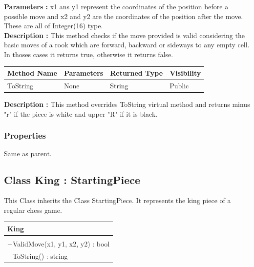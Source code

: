 \documentclass[12pt]{article}
\begin{document}
\textbf{Parameters :} x1 ans y1 represent the coordinates of the position before a possible move
and x2 and y2 are the coordinates of the position after the move. These are all of Integer(16) type.
\\
\textbf{Description :} This method checks if the move provided is
valid considering the basic moves of a rook which are forward,
backward or sideways to any empty cell. In thoses cases it returns
true, otherwise it returns false. 

\begin{table}[H]
    \begin{tabular}{|l|l|l|l|}
    \hline
    \rowcolor[HTML]{EFEFEF} 
    \cellcolor[HTML]{EFEFEF}\textbf{Method Name} & \textbf{Parameters}  & \textbf{Returned Type} & \textbf{Visibility} \\ \hline
    ToString                                   & None                 & String                   & Public              \\ \hline
    \end{tabular}
\end{table}

\textbf{Description :} This method overrides ToString virtual
method and returns minus "r" if the piece is white and upper "R"
if it is black.

\subsubsection{Properties}

Same as parent.
\newpage


\subsection{Class King : StartingPiece}

This Class inherits the Class StartingPiece. It represents the king 
piece of a regular chess game.
\begin{table}[H]
    \begin{tabular}{|l|}
    \hline
    \cellcolor[HTML]{C0C0C0}\textbf{King} \\ \hline
    \cellcolor[HTML]{EFEFEF}                    \\ \hline
    +ValidMove(x1, y1, x2, y2) : bool           \\ \hline
    +ToString() : string                        \\ \hline
    \end{tabular}
\end{table}
\end{document}
